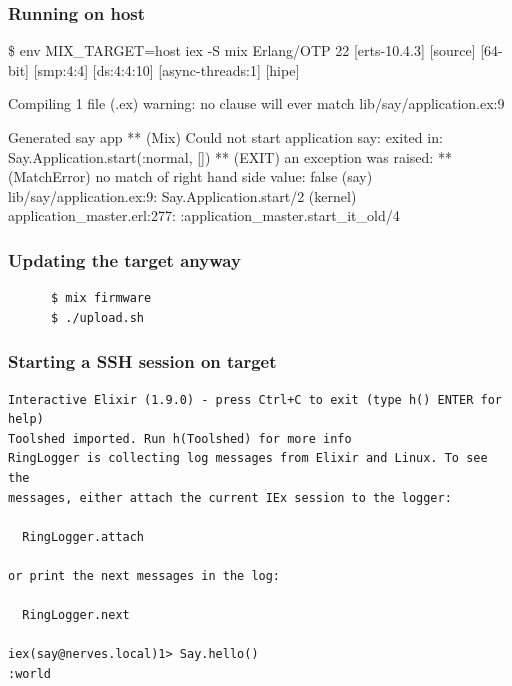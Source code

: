 \documentclass[10pt,xcolor=pdflatex,dvipsnames,table]{beamer}
\begin{document}
\begin{frame}[fragile]
  \frametitle{Running on host}

  \begin{example}
    \begin{semiverbatim}
      \scriptsize
{\color{blue}\$} env MIX_TARGET=host iex -S mix
Erlang/OTP 22 [erts-10.4.3] [source] [64-bit] [smp:4:4] [ds:4:4:10] [async-threads:1] [hipe]

Compiling 1 file (.ex)
{\color{yellow}warning:} no clause will ever match
  lib/say/application.ex:9

Generated say app
{\color{red}** (Mix) Could not start application say: exited in: Say.Application.start(:normal, [])
    ** (EXIT) an exception was raised:
        ** (MatchError) no match of right hand side value: false
            (say) lib/say/application.ex:9: Say.Application.start/2
            (kernel) application_master.erl:277: :application_master.start_it_old/4}
    \end{semiverbatim}
  \end{example}
\end{frame}

\begin{frame}[fragile]
  \frametitle{Updating the target anyway}

  \begin{example}
    \begin{verbatim}
      $ mix firmware
      $ ./upload.sh
    \end{verbatim}
  \end{example}
\end{frame}

\begin{frame}[fragile]
  \frametitle{Starting a SSH session on target}

  \begin{verbatim}
Interactive Elixir (1.9.0) - press Ctrl+C to exit (type h() ENTER for help)
Toolshed imported. Run h(Toolshed) for more info
RingLogger is collecting log messages from Elixir and Linux. To see the
messages, either attach the current IEx session to the logger:

  RingLogger.attach

or print the next messages in the log:

  RingLogger.next

iex(say@nerves.local)1> Say.hello()
:world
  \end{verbatim}
\end{frame}
\end{document}
